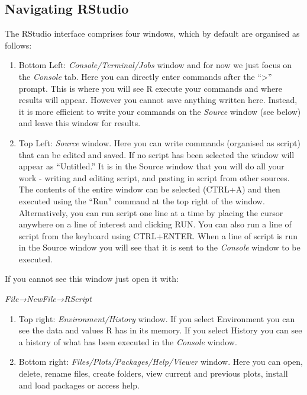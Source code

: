 \documentclass[
]{book}
\begin{document}
\hypertarget{Rstudio}{%
\subsection{Navigating RStudio}\label{Rstudio}}

The RStudio interface comprises four windows, which by default are
organised as follows:

\begin{enumerate}
\def\labelenumi{\arabic{enumi}.}
\item
  Bottom Left: \emph{Console/Terminal/Jobs} window and for now we just
  focus on the \emph{Console} tab. Here you can directly enter commands
  after the ``\textgreater{}'' prompt. This is where you will see R
  execute your commands and where results will appear. However you
  cannot save anything written here. Instead, it is more efficient to
  write your commands on the \emph{Source} window (see below) and leave
  this window for results.
\item
  Top Left: \emph{Source} window. Here you can write commands (organised
  as script) that can be edited and saved. If no script has been
  selected the window will appear as ``Untitled.'' It is in the Source
  window that you will do all your work - writing and editing script,
  and pasting in script from other sources. The contents of the entire
  window can be selected (CTRL+A) and then executed using the ``Run''
  command at the top right of the window. Alternatively, you can run
  script one line at a time by placing the cursor anywhere on a line of
  interest and clicking RUN. You can also run a line of script from the
  keyboard using CTRL+ENTER. When a line of script is run in the Source
  window you will see that it is sent to the \emph{Console} window to be
  executed.
\end{enumerate}

If you cannot see this window just open it with:

\emph{File→NewFile→RScript}

\begin{enumerate}
\def\labelenumi{\arabic{enumi}.}
\setcounter{enumi}{2}
\item
  Top right: \emph{Environment/History} window. If you select
  Environment you can see the data and values R has in its memory. If
  you select History you can see a history of what has been executed in
  the \emph{Console} window.
\item
  Bottom right: \emph{Files/Plots/Packages/Help/Viewer} window. Here you
  can open, delete, rename files, create folders, view current and
  previous plots, install and load packages or access help.
\end{enumerate}
\end{document}
